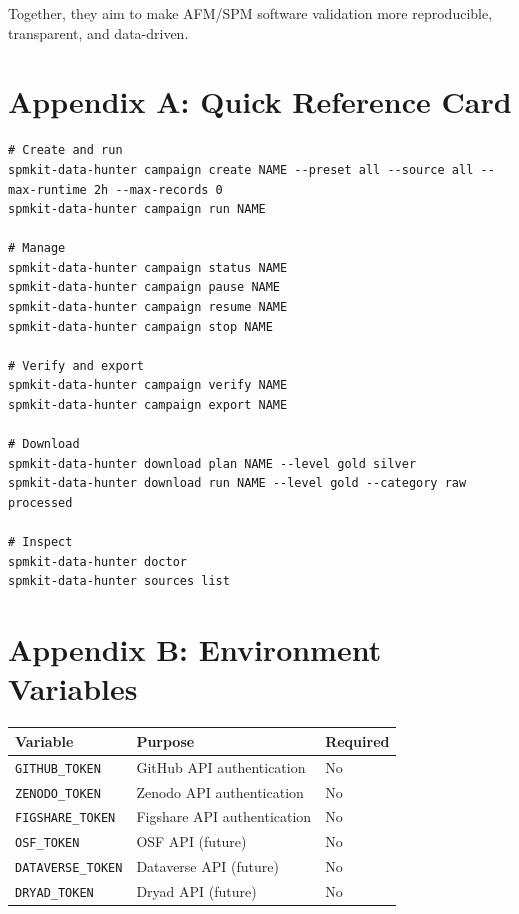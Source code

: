 \documentclass[11pt,a4paper]{article}
\begin{document}
Together, they aim to make AFM/SPM software validation more reproducible, transparent, and data-driven.

\section*{Appendix A: Quick Reference Card}

\begin{lstlisting}
# Create and run
spmkit-data-hunter campaign create NAME --preset all --source all --max-runtime 2h --max-records 0
spmkit-data-hunter campaign run NAME

# Manage
spmkit-data-hunter campaign status NAME
spmkit-data-hunter campaign pause NAME
spmkit-data-hunter campaign resume NAME
spmkit-data-hunter campaign stop NAME

# Verify and export
spmkit-data-hunter campaign verify NAME
spmkit-data-hunter campaign export NAME

# Download
spmkit-data-hunter download plan NAME --level gold silver
spmkit-data-hunter download run NAME --level gold --category raw processed

# Inspect
spmkit-data-hunter doctor
spmkit-data-hunter sources list
\end{lstlisting}

\section*{Appendix B: Environment Variables}

\begin{center}
\begin{tabular}{lll}
\toprule
\textbf{Variable} & \textbf{Purpose} & \textbf{Required} \\
\midrule
\texttt{GITHUB\_TOKEN} & GitHub API authentication & No \\
\texttt{ZENODO\_TOKEN} & Zenodo API authentication & No \\
\texttt{FIGSHARE\_TOKEN} & Figshare API authentication & No \\
\texttt{OSF\_TOKEN} & OSF API (future) & No \\
\texttt{DATAVERSE\_TOKEN} & Dataverse API (future) & No \\
\texttt{DRYAD\_TOKEN} & Dryad API (future) & No \\
\bottomrule
\end{tabular}
\end{center}
\end{document}
